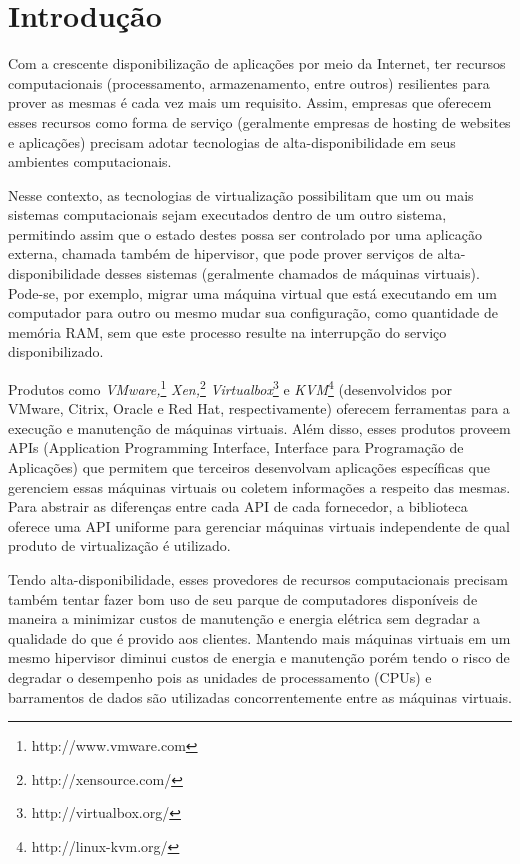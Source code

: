 %
%

\chapter{Introdução}

Com a crescente disponibilização de aplicações por meio da Internet, ter
recursos computacionais (processamento, armazenamento, entre outros)
resilientes para prover as mesmas é cada vez mais um requisito. Assim,
empresas que oferecem esses recursos como forma de serviço (geralmente
empresas de hosting de websites e aplicações) precisam adotar tecnologias
de alta-disponibilidade em seus ambientes computacionais.

Nesse contexto, as tecnologias de virtualização possibilitam que um ou mais
sistemas computacionais sejam executados dentro de um outro sistema,
permitindo assim que o estado destes possa ser controlado por uma aplicação
externa, chamada também de hipervisor, que pode prover serviços de
alta-disponibilidade desses sistemas (geralmente chamados de máquinas
virtuais). Pode-se, por exemplo, migrar uma máquina virtual que está
executando em um computador para outro ou mesmo mudar sua configuração,
como quantidade de memória RAM, sem que este processo resulte na
interrupção do serviço disponibilizado.

Produtos como \emph{VMware,}\footnote{http://www.vmware.com}
\emph{Xen,}\footnote{http://xensource.com/}
\emph{Virtualbox}\footnote{http://virtualbox.org/} e
\emph{KVM}\footnote{http://linux-kvm.org/} (desenvolvidos por VMware,
Citrix, Oracle e Red Hat, respectivamente) oferecem ferramentas para a
execução e manutenção de máquinas virtuais. Além disso, esses produtos
proveem APIs (Application Programming Interface, Interface para Programação
de Aplicações) que permitem que terceiros desenvolvam aplicações
específicas que gerenciem essas máquinas virtuais ou coletem informações a
respeito das mesmas. Para abstrair as diferenças entre cada API de cada
fornecedor, a biblioteca \libvirt{} oferece uma API uniforme para gerenciar
máquinas virtuais independente de qual produto de virtualização é
utilizado.

Tendo alta-disponibilidade, esses provedores de recursos computacionais
precisam também tentar fazer bom uso de seu parque de computadores
disponíveis de maneira a  minimizar custos de manutenção e energia elétrica
sem degradar a qualidade do que é provido aos clientes. Mantendo mais
máquinas virtuais em um mesmo hipervisor diminui custos de energia e
manutenção porém tendo o risco de degradar o desempenho pois as unidades de
processamento (CPUs) e barramentos de dados são utilizadas concorrentemente
entre as máquinas virtuais.

